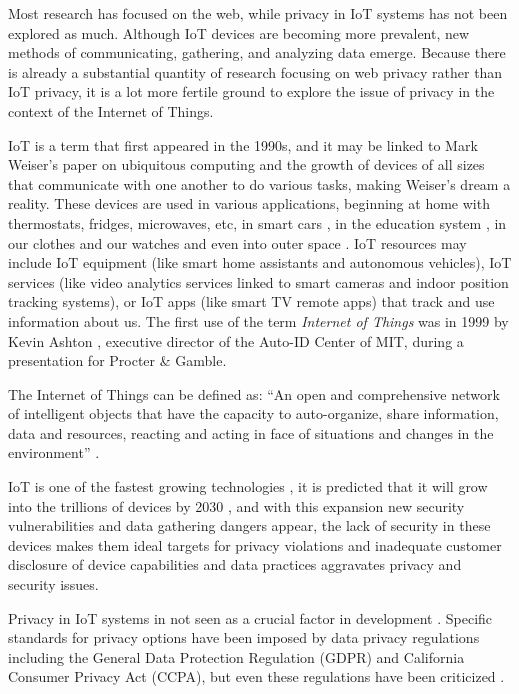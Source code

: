 \documentclass[conference]{IEEEtran}
\begin{document}
Most research has focused on the web, while privacy in IoT systems has not
been explored as much. Although IoT devices are becoming more prevalent,
new methods of communicating, gathering, and analyzing data emerge.
Because there is already a substantial quantity of research focusing on web
privacy rather than IoT privacy, it is a lot more fertile ground to explore
the issue of privacy in the context of the Internet of Things.

IoT is a term that first appeared in the 1990s, and it may be linked to Mark
Weiser's paper on ubiquitous computing \cite{weiser1991computer} and the growth
of devices of all sizes that communicate with one another to do various tasks,
making Weiser's dream a reality. These devices are used in various applications,
beginning at home \cite{marikyan2019systematic} with thermostats, fridges, microwaves,
etc, in smart cars \cite{arena2020overview}, in the education system \cite{al2020survey},
in our clothes and our watches \cite{niknejad2020comprehensive} and even into
outer space \cite{AkyildizInternet}. IoT resources may include IoT equipment
(like smart home assistants and autonomous vehicles), IoT services (like video
analytics services linked to smart cameras and indoor position tracking systems),
or IoT apps (like smart TV remote apps) that track and use information about us.
The first use of the term \textit{Internet of Things} was in 1999 by Kevin
Ashton \cite{KevinThat}, executive director of the Auto-ID Center of MIT,
during a presentation for Procter \& Gamble.

The Internet of Things can be defined as: ``An open and comprehensive network
of intelligent objects that have the capacity to auto-organize, share information,
data and resources, reacting and acting in face of situations and changes in
the environment'' \cite{madakam2015internet}.

IoT is one of the fastest growing technologies \cite{MohammadState}, it is predicted
that it will grow into the trillions of devices by 2030 \cite{SarawiInternet},
and with this expansion new security vulnerabilities and data gathering dangers
appear, the lack of security in these devices makes them ideal targets for privacy
violations and inadequate customer disclosure of device capabilities and data
practices aggravates privacy and security issues.

Privacy in IoT systems in not seen as a crucial factor in development \cite{alhirabi2021security}.
Specific standards for privacy options have been imposed by data privacy regulations
including the General Data Protection Regulation (GDPR) and California Consumer
Privacy Act (CCPA), but even these regulations have been criticized \cite{peloquin2020disruptive, gladis2022weaponizing, gentile2022deficient, green2022flaws, byun2019privacy}.
\end{document}

